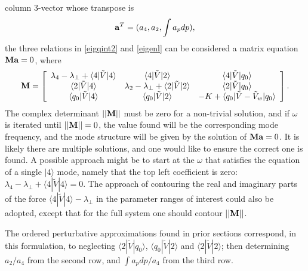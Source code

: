 \documentclass[12pt]{article}
\def\ket#1{|#1\rangle}
\def\bra#1{\langle#1}
\def\a{{\bf a}}
\def\M{{\bf M}}
\begin{document}
column 3-vector whose transpose is
\begin{equation}
  \label{avector}
  \a^T=(a_4,a_2,\int a_pdp),
\end{equation}
the three relations in \ref{eigqint2} and \ref{eigenl} can be
considered a matrix equation $\M\a=0$, where
\begin{equation}
  \label{aveq}
  \M=\left[
  \begin{array}{ccc}
    \lambda_4-\lambda_\perp+\bra{4}|\tilde V\ket{4}
    &\bra{4}|\tilde V\ket{2}&\bra{4}|\tilde V\ket{q_0}\\
    \bra{2}|\tilde V\ket{4}
    &\lambda_2-\lambda_\perp+\bra{2}|\tilde
      V\ket{2}&\bra{2}|\tilde V\ket{q_0}\\
    \bra{q_0}|\tilde V\ket{4}
    &\bra{q_0}|\tilde V\ket{2}&-K+\bra{q_0}|\tilde V-\tilde V_w\ket{q_0}
  \end{array}\right]
\iffalse
\left[
  \begin{array}{c}
    a_4\\
    a_2\\
    \int a_pdp
  \end{array}\right]=0.
\fi.
\end{equation}
The complex determinant $||\M||$ must be zero for a non-trivial
solution, and if $\omega$ is iterated until $||\M||=0$, the value
found will be the corresponding mode frequency, and the mode structure
will be given by the solution of $\M\a=0$. It is likely there are
multiple solutions, and one would like to ensure the correct one is
found. A possible approach might be to start at the $\omega$ that
satisfies the equation of a single $\ket{4}$ mode, namely that the top
left coefficient is zero:
$\lambda_4-\lambda_\perp+\bra{4}|\tilde V\ket{4}=0$.  The approach of
contouring the real and imaginary parts of the force
$\bra{4}|\tilde V\ket{4}-\lambda_\perp$ in the parameter ranges of
interest could also be adopted, except that for the full system one
should contour $||\M||$.

The ordered perturbative approximations found in prior sections correspond,
in this formulation, to neglecting $\bra{2}|\tilde V\ket{q_0}$,
$\bra{q_0}|\tilde V\ket{2}$ and $\bra{2}|\tilde V\ket{2}$; then
determining $a_2/a_4$ from the second row, and $\int a_pdp/a_4$ from the third
row.
\end{document}
